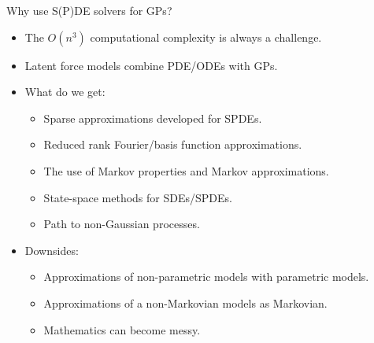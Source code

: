 \documentclass[first=dgreen,second=purple,presentation]{elecslides}
\begin{document}
\begin{frame}{Why use S(P)DE solvers for GPs?}

\begin{itemize}[<+->]
\item The $O(n^3)$ \alert{computational complexity} is always a challenge.
\item \alert{Latent force models} combine PDE/ODEs with GPs.
\item What do we get:
\begin{itemize}[<+->]
\item \alert{Sparse approximations} developed for SPDEs.
\item \alert{Reduced rank} Fourier/basis function approximations.
\item The use of \alert{Markov properties} and Markov approximations.
\item \alert{State-space} methods for SDEs/SPDEs.
\item Path to \alert{non-Gaussian processes}.
\end{itemize}
\item Downsides:
\begin{itemize}[<+->]
\item Approximations of non-parametric models with parametric models.
\item Approximations of a non-Markovian models as Markovian.
\item Mathematics can become messy.
\end{itemize}
\end{itemize}
\end{frame}
\end{document}
